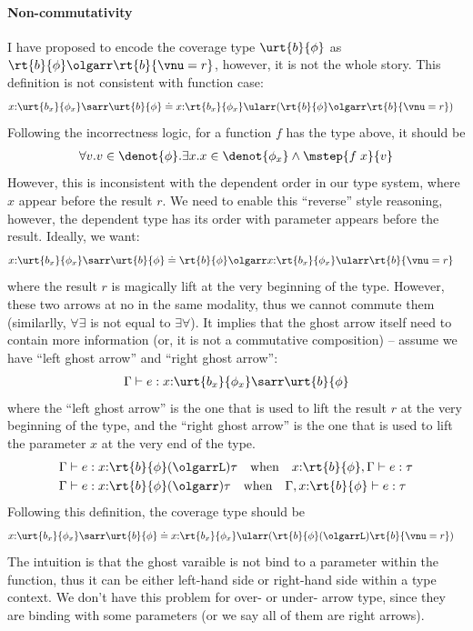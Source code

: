 \paragraph{Non-commutativity} I have proposed to encode the coverage type $\urt{b}{\phi}$ as $\rt{b}{\phi} \olgarr \rt{b}{\vnu = r}$, however, it is not the whole story. This definition is not consistent with function case:
\begin{align*}
    &x{:}\urt{b_x}{\phi_x} \sarr \urt{b}{\phi} \doteq x{:}\rt{b_x}{\phi_x} \ularr (\rt{b}{\phi} \olgarr \rt{b}{\vnu = r})
\end{align*}\noindent
Following the incorrectness logic, for a function $f$ has the type above, it should be
\begin{align*}
    \forall v. v\in \denot{\phi}. \exists x. x \in \denot{\phi_x} \land \mstep{f\;x}{v}
\end{align*}\noindent
However, this is inconsistent with the dependent order in our type system, where $x$ appear before the result $r$. We need to enable this ``reverse'' style reasoning, however, the dependent type has its order with parameter appears before the result. Ideally, we want:
\begin{align*}
    &x{:}\urt{b_x}{\phi_x} \sarr \urt{b}{\phi} \doteq \rt{b}{\phi} \olgarr x{:}\rt{b_x}{\phi_x} \ularr \rt{b}{\vnu = r}
\end{align*}\noindent
where the result $r$ is magically lift at the very beginning of the type. However, these two arrows at no in the same modality, thus we cannot commute them (similarlly, $\forall\exists$ is not equal to $\exists\forall$). It implies that the ghost arrow itself need to contain more information (or, it is not a commutative composition) -- assume we have ``left ghost arrow'' and ``right ghost arrow'':
\begin{align*}
    &\Gamma \vdash e : x{:}\urt{b_x}{\phi_x} \sarr \urt{b}{\phi} \\
\end{align*}\noindent
where the ``left ghost arrow'' is the one that is used to lift the result $r$ at the very beginning of the type, and the ``right ghost arrow'' is the one that is used to lift the parameter $x$ at the very end of the type.
\begin{align*}
    &\Gamma \vdash e : x{:}\rt{b}{\phi} (\olgarrL) \tau \quad \text{when} \quad  x{:}\rt{b}{\phi}, \Gamma \vdash e : \tau \\ 
    &\Gamma \vdash e : x{:}\rt{b}{\phi} (\olgarr) \tau \quad \text{when} \quad  \Gamma, x{:}\rt{b}{\phi} \vdash e : \tau
\end{align*}\noindent
Following this definition, the coverage type should be
\begin{align*}
    &x{:}\urt{b_x}{\phi_x} \sarr \urt{b}{\phi} \doteq x{:}\rt{b_x}{\phi_x} \ularr (\rt{b}{\phi} (\olgarrL) \rt{b}{\vnu = r})
\end{align*}\noindent
The intuition is that the ghost varaible is not bind to a parameter within the function, thus it can be either left-hand side or right-hand side within a type context. We don't have this problem for over- or under- arrow type, since they are binding with some parameters (or we say all of them are right arrows).

